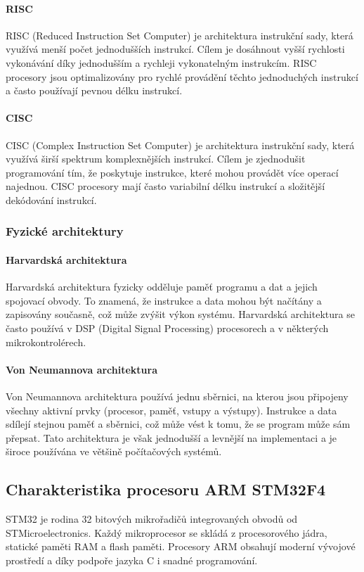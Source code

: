 \paragraph{RISC}
RISC (Reduced Instruction Set Computer) je architektura instrukční sady, která využívá menší počet jednodušších instrukcí. Cílem je dosáhnout vyšší rychlosti vykonávání díky jednodušším a rychleji vykonatelným instrukcím. RISC procesory jsou optimalizovány pro rychlé provádění těchto jednoduchých instrukcí a často používají pevnou délku instrukcí.

\paragraph{CISC}
CISC (Complex Instruction Set Computer) je architektura instrukční sady, která využívá širší spektrum komplexnějších instrukcí. Cílem je zjednodušit programování tím, že poskytuje instrukce, které mohou provádět více operací najednou. CISC procesory mají často variabilní délku instrukcí a složitější dekódování instrukcí.

\subsubsection{Fyzické architektury}

\paragraph{Harvardská architektura}
Harvardská architektura fyzicky odděluje paměť programu a dat a jejich spojovací obvody. To znamená, že instrukce a data mohou být načítány a zapisovány současně, což může zvýšit výkon systému. Harvardská architektura se často používá v DSP (Digital Signal Processing) procesorech a v některých mikrokontrolérech.

\paragraph{Von Neumannova architektura}
Von Neumannova architektura používá jednu sběrnici, na kterou jsou připojeny všechny aktivní prvky (procesor, paměť, vstupy a výstupy). Instrukce a data sdílejí stejnou paměť a sběrnici, což může vést k tomu, že se program může sám přepsat. Tato architektura je však jednodušší a levnější na implementaci a je široce používána ve většině počítačových systémů.

\subsection{Charakteristika procesoru ARM STM32F4}
STM32 je rodina 32 bitových mikrořadičů integrovaných obvodů od STMicroelectronics. Každý mikroprocesor se skládá z procesorového jádra, statické paměti RAM a flash paměti. Procesory ARM obsahují moderní vývojové prostředí a díky podpoře jazyka C i snadné programování.

